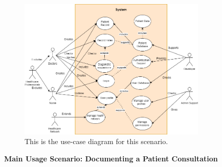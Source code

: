 \documentclass[12pt]{article}
\begin{document}
\begin{figure}[H]
  \includegraphics[width=0.8\textwidth]{use-case.drawio.png}
  \caption{This is the use-case diagram for this scenario.}
  \label{fig:Use-Case Diagram}
\end{figure}

\textbf{Main Usage Scenario: Documenting a Patient Consultation}
\end{document}
